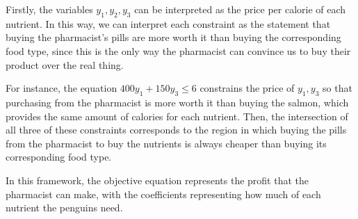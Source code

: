 \documentclass[11pt]{article}
\begin{document}
\begin{subparts}
\begin{solution}
	Firstly, the variables \(y_1, y_2, y_3\) can be interpreted as the price per calorie of each nutrient. 
	In this way, we can interpret each constraint as the statement that buying the pharmacist's pills 
	are more worth it than buying the corresponding food type, since this is the only way the pharmacist 
	can convince us to buy their product over the real thing. 

	For instance, the equation 
	\(400y_1 + 150 y_3 \le  6\) constrains the price of \(y_1, y_3\) so that purchasing from the pharmacist 
	is more worth it than buying the salmon, which provides the same amount of calories for each nutrient. Then, 
	the intersection of all three of these constraints corresponds to the region in which buying the pills 
	from the pharmacist to buy the nutrients is always cheaper than buying its corresponding food type.

	In this framework, the objective equation represents the profit that the pharmacist can 
	make, with the coefficients representing 
	how much of each nutrient the penguins need. 
\end{solution}
\end{subparts}

\newpage

\end{document}

